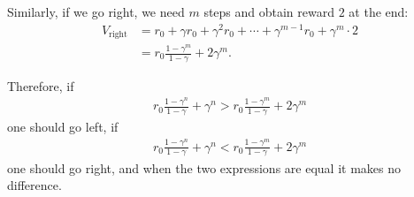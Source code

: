 \documentclass[12pt,twoside]{article}
\begin{document}
Similarly, if we go right, we need $m$ steps and obtain reward $2$ at the end:
\begin{align}
V_{\text{right}} &= r_0 + \gamma r_0 + \gamma^2 r_0 + \cdots + \gamma^{m-1} r_0 + \gamma^m \cdot 2 \\
&= r_0 \frac{1 - \gamma^m}{1 - \gamma} + 2\gamma^m.
\end{align}

Therefore, if
\begin{align}
r_0 \frac{1 - \gamma^n}{1 - \gamma} + \gamma^n
>
r_0 \frac{1 - \gamma^m}{1 - \gamma} + 2\gamma^m
\end{align}
one should go left, if
\begin{align}
r_0 \frac{1 - \gamma^n}{1 - \gamma} + \gamma^n
<
r_0 \frac{1 - \gamma^m}{1 - \gamma} + 2\gamma^m
\end{align}
one should go right, and when the two expressions are equal it makes no difference.
\end{document}
